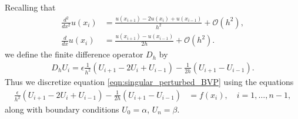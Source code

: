Recalling that
\begin{align*}
\frac{d^2}{dx^2} u(x_i) &= \frac{u(x_{i+1})- 2u(x_i) + u(x_{i-1})}{h^2} + \mathcal{O}(h^2),\\
\frac{d}{dx} u(x_i) &= \frac{u(x_{i+1})-u(x_{i-1})}{2h} + \mathcal{O}(h^2).
\end{align*}
we define the finite difference operator $D_h$ by
\begin{align}
D_h U_i = \epsilon \frac{1}{h^2}\left(U_{i+1} -2U_i + U_{i-1}\right) - \frac{1}{2h} \left(U_{i+1}-U_{i-1} \right). \label{fd_operator}
\end{align}
Thus we discretize equation \eqref{eqn:singular_perturbed_BVP} using the equations
\begin{align*}
	\frac{\epsilon}{h^2} (U_{i+1}- 2U_i + U_{i-1}) - \frac{1}{2h} \left(U_{i+1}-U_{i-1} \right)  &= f(x_i), \quad i = 1, \ldots, n-1,
\end{align*}
along with boundary conditions $U_{0} = \alpha$, $U_{n} = \beta$.

